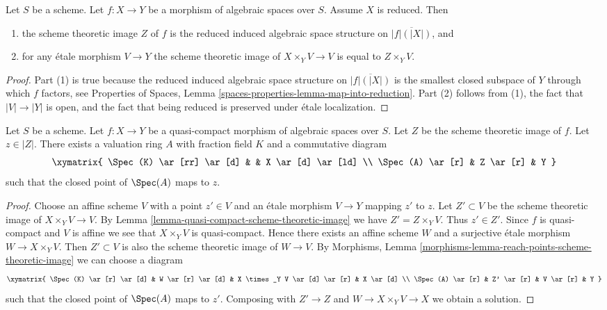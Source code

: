 \begin{lemma}
\label{lemma-scheme-theoretic-image-reduced}
Let $S$ be a scheme. Let $f : X \to Y$ be a morphism of algebraic spaces
over $S$. Assume $X$ is reduced. Then
\begin{enumerate}
\item the scheme theoretic image $Z$ of $f$ is the reduced induced algebraic
space structure on $\overline{|f|(|X|)}$, and
\item for any \'etale morphism $V \to Y$ the scheme theoretic image of
$X \times_Y V \to V$ is equal to $Z \times_Y V$.
\end{enumerate}
\end{lemma}

\begin{proof}
Part (1) is true because the reduced induced algebraic space structure on
$\overline{|f|(|X|)}$ is the smallest closed subspace
of $Y$ through which $f$ factors, see
Properties of Spaces, Lemma \ref{spaces-properties-lemma-map-into-reduction}.
Part (2) follows from (1), the fact that $|V| \to |Y|$ is open, and the
fact that being reduced is preserved under \'etale localization.
\end{proof}

\begin{lemma}
\label{lemma-reach-points-scheme-theoretic-image}
Let $S$ be a scheme.
Let $f : X \to Y$ be a quasi-compact morphism of algebraic spaces over $S$.
Let $Z$ be the scheme theoretic image of $f$.
Let $z \in |Z|$. There exists a valuation ring $A$ with
fraction field $K$ and a commutative diagram
$$
\xymatrix{
\Spec(K) \ar[rr] \ar[d] & & X \ar[d] \ar[ld] \\
\Spec(A) \ar[r] & Z \ar[r] & Y
}
$$
such that the closed point of $\Spec(A)$ maps to $z$.
\end{lemma}

\begin{proof}
Choose an affine scheme $V$ with a point $z' \in V$
and an \'etale morphism $V \to Y$ mapping $z'$ to $z$.
Let $Z' \subset V$ be the scheme theoretic image of $X \times_Y V \to V$.
By Lemma \ref{lemma-quasi-compact-scheme-theoretic-image} we have
$Z' = Z \times_Y V$. Thus $z' \in Z'$.
Since $f$ is quasi-compact and $V$ is affine we see that
$X \times_Y V$ is quasi-compact. Hence
there exists an affine scheme $W$ and a surjective \'etale
morphism $W \to X \times_Y V$. Then $Z' \subset V$ is also the
scheme theoretic image of $W \to V$.
By Morphisms, Lemma \ref{morphisms-lemma-reach-points-scheme-theoretic-image}
we can choose a diagram
$$
\xymatrix{
\Spec(K) \ar[r] \ar[d] &
W \ar[r] \ar[d] &
X \times_Y V \ar[d] \ar[r] &
X \ar[d] \\
\Spec(A) \ar[r] &
Z' \ar[r] &
V \ar[r] &
Y
}
$$
such that the closed point of $\Spec(A)$ maps to $z'$.
Composing with $Z' \to Z$ and $W \to X \times_Y V \to X$
we obtain a solution.
\end{proof}

